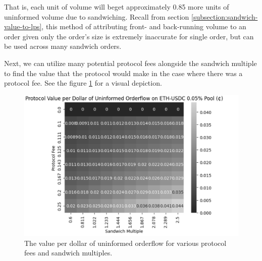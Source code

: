 
        
    That is, each unit of volume will beget approximately 0.85 more units of uninformed volume due to sandwiching. Recall from section \ref{subsection:sandwich-value-to-lps}, this method of attributing front- and back-running volume to an order given only the order's size is extremely inaccurate for single order, but can be used across many sandwich orders.

    Next, we can utilize many potential protocol fees alongside the sandwich multiple to find the value that the protocol would make in the case where there was a protocol fee. See the figure \ref{fig:proto-value-per-dollar-many-sandwich-multiple} for a visual depiction.

    \begin{figure}
        \label{fig:proto-value-per-dollar-many-sandwich-multiple}
        \centering
        \includegraphics[scale=.43]{figs/protocol-value-per-orderflow-dollar.png}
        \caption{The value per dollar of uninformed orderflow for various protocol fees and sandwich multiples.}
    \end{figure}

